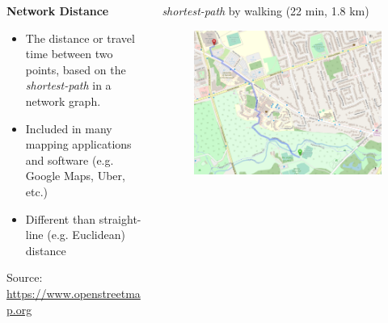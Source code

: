 \documentclass[aspectratio=169]{beamer}
\begin{document}
\begin{frame}
	
	
	\begin{columns}
		\begin{column}{0.5\textwidth}
			\textbf{Network Distance}
			
			\begin{itemize}
				\item The distance or travel time between two points, based on the \textit{shortest-path} in a network graph.
				\item Included in many mapping applications and software (e.g. Google Maps, Uber, etc.)
				\item Different than straight-line (e.g. Euclidean) distance
			\end{itemize}
			\vspace{4mm}
			\tiny Source: \url{https://www.openstreetmap.org}
		\end{column}
		\begin{column}{0.5\textwidth}
			
			\small \textit{shortest-path} by walking (22 min, 1.8 km)
			\begin{figure}
				\centering
				\includegraphics[width=1\linewidth]{images/route_utsc_walk}
			\end{figure}
		\end{column}
	\end{columns}

\end{frame}
\end{document}
